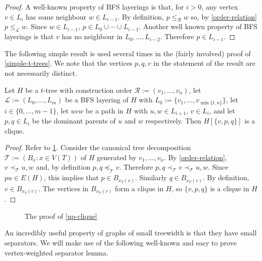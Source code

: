 \documentclass[kpfonts]{patmorin}
\theoremstyle{named}
\begin{document}
\begin{proof}
    A well-known property of BFS layerings is that, for $i>0$, any vertex $v\in L_{i}$ has some neighbour $w\in L_{i-1}$.  By definition, $p\le_\mathcal{R} w$ so, by \cref{order-relation} $p\le_\mathcal{L} w$. Since $w\in L_{i-1}$, $p\in L_0\cup\cdots\cup L_{i-1}$.  Another well known property of BFS layerings is that $v$ has no neighbour in $L_0,\ldots,L_{i-2}$.  Therefore $p\in L_{i-1}$.
\end{proof}

The following simple result is used several times in the (fairly involved) proof of \cref{simple-t-trees}.  We note that the vertices $p,q,v$ in the statement of the result are not necessarily distinct.

\begin{obs}\label{up-clique}
    Let $H$ be a $t$-tree with construction order $\mathcal{R}:=(v_1,\ldots,v_n)$, let $\mathcal{L}:=(L_0,\ldots,L_m)$ be a BFS layering of $H$ with $L_0:=\{v_1,\ldots,v_{\min\{t,n\}}\}$, let $i\in\{0,\ldots,m-1\}$, let $uvw$ be a path in $H$ with $u,w\in L_{i+1}$, $v\in L_{i}$, and let $p,q\in L_{i}$ be the dominant parents of $u$ and $w$ respectively.  Then $H[\{v,p,q\}]$ is a clique.
\end{obs}


\begin{proof}
    Refer to \cref{up-clique-figure}. Consider the canonical tree decomposition $\mathcal{T}:=(B_x:x\in V(T))$ of $H$ generated by $v_1,\ldots,v_n$.  By \cref{order-relation}, $v\prec_{\mathcal{T}} u,w$ and, by definition $p,q\preceq_{\mathcal{T}} v$.  Therefore $p,q\prec_{\mathcal{T}} v\prec_{\mathcal{T}} u,w$.  Since $pu\in E(H)$, this implies that $p\in B_{x_T(v)}$.  Similarly $q\in B_{x_T(v)}$.  By definition, $v\in B_{x_T(v)}$.  The vertices in $B_{x_T(v)}$ form a clique in $H$, so $\{v,p,q\}$ is a clique in $H$.
\end{proof}

\begin{figure}
    \caption{The proof of \cref{up-clique}}
    \label{up-clique-figure}
\end{figure}

An incredibly useful property of graphs of small treewidth is that they have small separators. We will make use of the following well-known and easy to prove vertex-weighted separator lemma.
\end{document}
